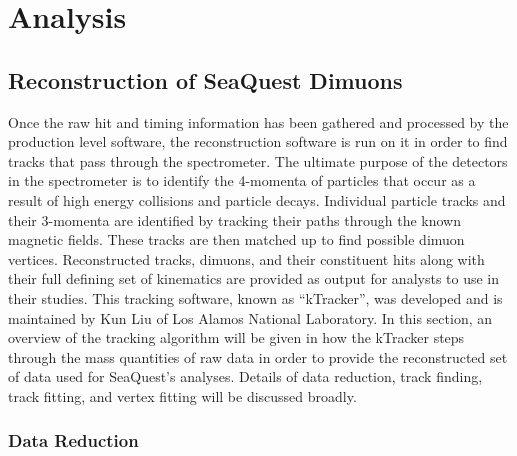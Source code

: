 \chapter{Analysis}



\section{Reconstruction of SeaQuest Dimuons}

Once the raw hit and timing information has been gathered and processed by the production level software, the reconstruction software is run on it in order to find tracks that pass through the spectrometer. The ultimate purpose of the detectors in the spectrometer is to identify the 4-momenta of particles that occur as a result of high energy collisions and particle decays. Individual particle tracks and their 3-momenta are identified by tracking their paths through the known magnetic fields.  These tracks are then matched up to find possible dimuon vertices. Reconstructed tracks, dimuons, and their constituent hits along with their full defining set of kinematics are provided as output for analysts to use in their studies. This tracking software, known as ``kTracker'', was developed and is maintained by Kun Liu of Los Alamos National Laboratory.  In this section, an overview of the tracking algorithm will be given in how the kTracker steps through the mass quantities of raw data in order to provide the reconstructed set of data used for SeaQuest's analyses. Details of data reduction, track finding, track fitting, and vertex fitting will be discussed broadly. 

\subsection{Data Reduction}

